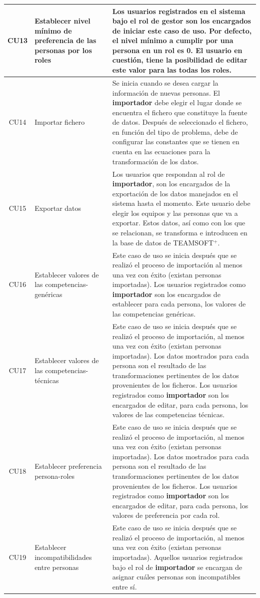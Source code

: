 \begin{longtable}{| c | p{3cm} | p{9cm} |}
	CU13&Establecer nivel mínimo de preferencia de las personas por los roles & Los usuarios registrados en el sistema bajo el rol de \textbf{gestor} son los encargados de iniciar este caso de uso. Por defecto, el nivel mínimo a cumplir por una persona en un rol es 0. El usuario en cuestión, tiene la posibilidad de editar este valor para las todas los roles.\\ \hline
	
	CU14&Importar fichero & Se inicia cuando se desea cargar la información de nuevas personas. El \textbf{importador} debe elegir el lugar donde se encuentra el fichero que constituye la fuente de datos. Después de seleccionado el fichero, en función del tipo de problema, debe de configurar las constantes que se tienen en cuenta en las ecuaciones para la transformación de los datos.
	\\ \hline
	
	CU15&Exportar datos & Los usuarios que respondan al rol de \textbf{importador}, son los encargados de la exportación de los datos manejados en el sistema hasta el momento. Este usuario debe elegir los equipos y las personas que va a exportar. Estos datos, así como con los que se relacionan, se transforma e introducen en la base de datos de TEAMSOFT$^+$.\\ \hline
	
	CU16&Establecer valores de las competencias-genéricas & Este caso de uso se inicia después que se realizó el proceso de importación al menos una vez con éxito (existan personas importadas). Los usuarios registrados como \textbf{importador} son los encargados de establecer para cada persona, los valores de las competencias genéricas.\\ \hline
	
	CU17&Establecer valores de las competencias-técnicas & Este caso de uso se inicia después que se realizó el proceso de importación, al menos una vez con éxito (existan personas importadas). Los datos mostrados para cada persona son el resultado de las transformaciones pertinentes de los datos provenientes de los ficheros. Los usuarios registrados como \textbf{importador} son los encargados de editar, para cada persona, los valores de las competencias técnicas.\\ \hline
	
	CU18&Establecer preferencia persona-roles & Este caso de uso se inicia después que se realizó el proceso de importación, al menos una vez con éxito (existan personas importadas). Los datos mostrados para cada persona son el resultado de las transformaciones pertinentes de los datos provenientes de los ficheros. Los usuarios registrados como \textbf{importador} son los encargados de editar, para cada persona, los valores de preferencia por cada rol.\\ \hline
	
	CU19&Establecer incompatibilidades entre personas & Este caso de uso se inicia después que se realizó el proceso de importación, al menos una vez con éxito (existan personas importadas). Aquellos usuarios registrados bajo el rol de \textbf{importador} se encargan de asignar cuáles personas son incompatibles entre sí.\\
	\bottomrule[1pt]
\end{longtable}
